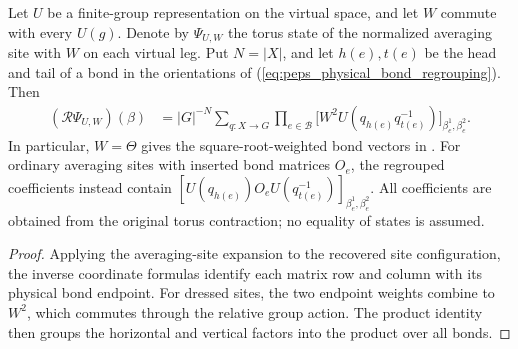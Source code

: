 \begin{lemma}%
    \label{thm:peps_torus_regrouped_averaging_bonds}
    \leanok
    Let $U$ be a finite-group representation on the virtual space, and
    let $W$ commute with every $U(g)$. Denote by $\Psi_{U,W}$ the
    torus state of the normalized averaging site with $W$ on each virtual
    leg. Put $N=|X|$, and let $h(e),t(e)$ be the head and tail of a bond
    in the orientations of (\ref{eq:peps_physical_bond_regrouping}). Then
    \begin{align}
        (\mathcal R\Psi_{U,W})(\beta)
         & =|G|^{-N}\sum_{q:X\to G}\prod_{e\in\mathcal B}
        \bigl[W^2U(q_{h(e)}q_{t(e)}^{-1})\bigr]_
        {\beta_e^1,\beta_e^2}.
        \label{eq:peps_actual_regrouped_weighted_bonds}
    \end{align}
    In particular, $W=\Theta$ gives the square-root-weighted
    bond vectors in \cite[Section~7]{Schuch2010PEPS}.
    For ordinary averaging sites with inserted bond matrices $O_e$, the
    regrouped coefficients instead contain
    $[U(q_{h(e)})O_eU(q_{t(e)}^{-1})]_{\beta_e^1,\beta_e^2}$.
    All coefficients are obtained from the original torus contraction;
    no equality of states is assumed.
\end{lemma}
\begin{proof}\leanok
    Applying the averaging-site expansion to the recovered site
    configuration, the inverse coordinate formulas identify each matrix
    row and column with its physical bond endpoint. For dressed
    sites, the two endpoint weights combine to $W^2$, which commutes
    through the relative group action. The product identity then groups
    the horizontal and vertical factors into the product over all bonds.
\end{proof}
